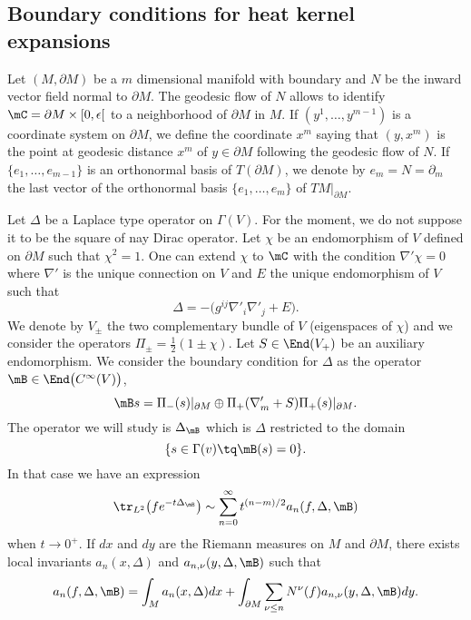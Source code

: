 \subsection{Boundary conditions for heat kernel expansions}


Let $(M,\partial M)$ be a $m$ dimensional manifold with boundary and $N$ be the inward vector field normal to $\partial M$. The geodesic flow of $N$ allows to identify $\mC=\partial M\times [0,\epsilon[$ to a neighborhood of $\partial M$ in $M$. If $(y^1,\ldots,y^{m-1})$ is a coordinate system on $\partial M$, we define the coordinate $x^m$ saying that $(y,x^m)$ is the point at geodesic distance $x^m$ of $y\in \partial M$ following the geodesic flow of $N$. If $\{ e_1,\ldots,e_{m-1} \}$ is an orthonormal basis of $T(\partial M)$, we denote by $e_m=N=\partial_m$ the last vector of the orthonormal basis $\{ e_1,\ldots,e_m \}$ of $TM|_{\partial M}$.

Let $\Delta$ be a Laplace type operator on $\Gamma(V)$. For the moment, we do not suppose it to be the square of nay Dirac operator. Let $\chi$ be an endomorphism of $V$ defined on $\partial M$ such that $\chi^2=1$. One can extend $\chi$ to $\mC$ with the condition $\nabla'\chi=0$ where $\nabla'$ is the unique connection on $V$ and $E$ the unique endomorphism of $V$ such that
\[
  \Delta=-\big( g^{ij}\nabla'_i\nabla'_j+E \big).
\]
We denote by $V_{\pm}$ the two complementary bundle of $V$ (eigenspaces of $\chi$) and we consider the operators $\Pi_{\pm}=\frac{ 1 }{2}(1\pm\chi)$. Let $S\in\End(V_+)$ be an auxiliary endomorphism. We consider the boundary condition for $\Delta$ as the operator $\mB\in\End\big(  C^{\infty}(V) \big)$,
\begin{equation}
\mB s=\Pi_-(s)|_{\partial M}\oplus \Pi_+(\nabla'_m+S)\Pi_+(s)|_{\partial M}.
\end{equation}
The operator we will study is $\Delta_{\mB}$ which is $\Delta$ restricted to the domain
\[
  \{ s\in\Gamma(v)\tq \mB(s)=0 \}.
\]
In that case we have an expression
\begin{equation}
\tr_{L^2}\big( f e^{-t\Delta_{\mB}} \big)\sim\sum_{n=0}^{\infty}t^{(n-m)/2}a_n(f,\Delta,\mB)
\end{equation}
when $t\to 0^+$. If $dx$ and $dy$ are the Riemann measures on $M$ and $\partial M$, there exists local invariants $a_n(x,\Delta)$ and $a_{n,\nu}(y,\Delta,\mB)$ such that
\begin{equation}
a_n(f,\Delta,\mB)=\int_Ma_n(x,\Delta)dx+\int_{\partial M}\sum_{\nu\leq n}N^{\nu}(f)a_{n,\nu}(y,\Delta,\mB)dy.
\end{equation}

